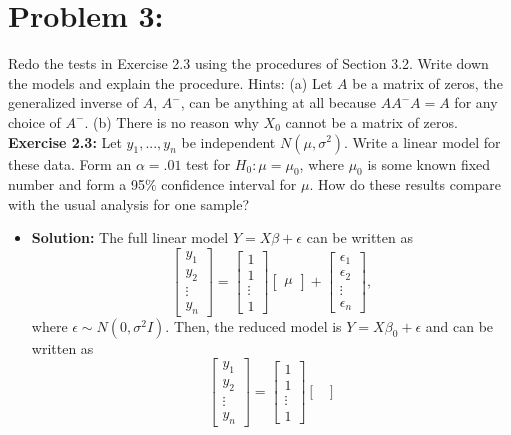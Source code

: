 \documentclass[11pt]{article}
\begin{document}
\section*{Problem 3:}  Redo the tests in Exercise 2.3 using the procedures of Section 3.2.  Write down the models and explain the procedure.  Hints:  (a) Let $A$ be a matrix of zeros, the generalized inverse of $A$, $A^-$, can be anything at all because $AA^-A = A$ for any choice of $A^-$.  (b) There is no reason why $X_0$ cannot be a matrix of zeros.  {\bf Exercise 2.3:}  Let $y_1,...,y_n$ be independent $N(\mu,\sigma^2)$.  Write a linear model for these data.  Form an $\alpha = .01$ test for $H_0\colon \mu=\mu_0$, where $\mu_0$ is some known fixed number and form a 95$\%$ confidence interval for $\mu$.  How do these results compare with the usual analysis for one sample?
\begin{itemize}
\item[] {\bf Solution:}  The full linear model $Y = X\beta + \epsilon$ can be written as
\[
\begin{bmatrix}
y_1 \\ y_2 \\ \vdots \\ y_n
\end{bmatrix} = \begin{bmatrix}
1 \\ 1 \\ \vdots \\ 1
\end{bmatrix}\begin{bmatrix}
\mu
\end{bmatrix} + \begin{bmatrix}
\epsilon_1 \\ \epsilon_2 \\ \vdots \\ \epsilon_n
\end{bmatrix},
\]
where $\epsilon \sim N(0,\sigma^2I)$.  Then, the reduced model is $Y=X\beta_0 + \epsilon$ and can be written as
\[
\begin{bmatrix}
y_1 \\ y_2 \\ \vdots \\ y_n
\end{bmatrix} = \begin{bmatrix}
1 \\ 1 \\ \vdots \\ 1
\end{bmatrix}\begin{bmatrix}

\end{bmatrix}\]
\end{itemize}
\end{document}

